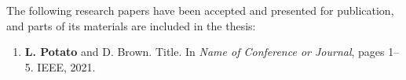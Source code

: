 The following research papers have been accepted and presented for publication, and parts of its materials are included in the thesis:

\begin{enumerate}
    \item \textbf{L. Potato} and D. Brown. Title. In \textit{Name of Conference or Journal}, pages 1--5. IEEE, 2021.
 
\end{enumerate}
